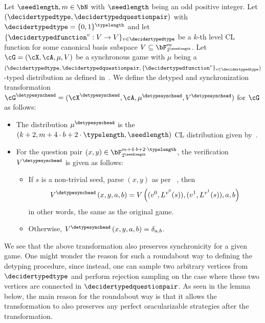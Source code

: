 \begin{definition}
	Let $\seedlength, m \in \bN$ with $\seedlength$ being an odd positive integer. Let $(\decidertypedtype, \decidertypedquestionpair)$ with $\decidertypedtype = \{0,1\}^{\typelength}$ and let $\{\decidertypedfunction^v: V \rightarrow V\}_{v \in \decidertypedtype}$ be a $k$-th level CL function for some canonical basis subspace $V \subseteq \bF_{2^{\seedlength}}^{m}$. Let $\cG = (\cX, \cA, \mu, V)$ be a synchronous game with $\mu$ being a $(\decidertypedtype, \decidertypedquestionpair, \{\decidertypedfunction^v \}_{v \in \decidertypedtype})$-typed distribution as defined in~. We define the detyped and synchronization transformation $\cG^{\detypesynchead} = (\cX^{\detypesynchead}, \cA, \mu^{\detypesynchead}, V^{\detypesynchead}) $ for $\cG$ as follows:
	\begin{itemize}
		\item The distribution $\mu^{\detypesynchead}$ is the $(k+2, m+ 4\cdot b + 2\cdot \typelength, \seedlength)$  CL distribution given by~. 
		\item For the question pair $(x,y) \in \bF_{2^{\seedlength}}^{m+ 4\cdot b + 2\cdot \typelength}$, the verification $V^{\detypesynchead}$ is given as follows:
		\begin{itemize}
			\item If $s$ is a non-trivial seed, parse $(x,y)$ as per ~, then 
			\begin{equation*}
				V^{\detypesynchead}\left(x, y,a,b \right) = V\left((v^0, L^{v^0}(s)), (v^1, L^{v^1}(s)),a,b \right)
			\end{equation*}
			in other words, the same as the original game. 
			\item Otherwise, $V^{\detypesynchead}\left(x,y,a,b \right) = \delta_{a,b}$.
		\end{itemize}
	\end{itemize}
\end{definition}
We see that the above transformation also preserves synchronicity for a given game. One might wonder the reason for such a roundabout way to defining the detyping procedure, since instead, one can sample two arbitrary vertices from $\decidertypedtype$ and  perform rejection sampling on the case where these two vertices are connected in $\decidertypedquestionpair$.  As seen in the lemma below, the main reason for the roundabout way is that it allows the transformation to also preserves any perfect oracularizable strategies after the transformation. 

